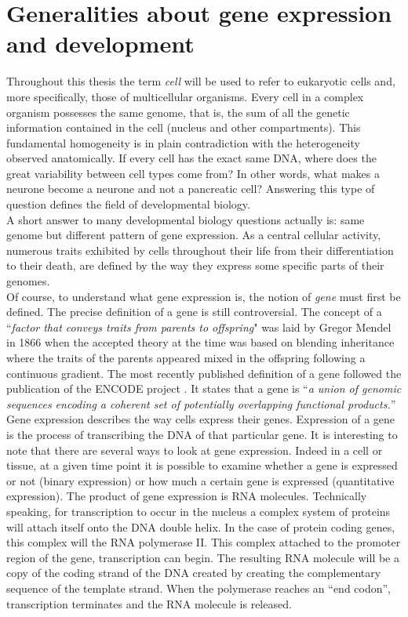 \section{Generalities about gene expression and development}\label{sec:gene_expression_background}     
       
     Throughout this thesis the term \emph{cell} will be used to refer to eukaryotic cells and, more specifically, those of multicellular organisms. Every cell in a complex organism possesses the same genome, that is, the sum of all the genetic information contained in the cell (nucleus and other compartments). This fundamental homogeneity is in plain contradiction with the heterogeneity observed anatomically. If every cell has the exact same DNA, where does the great variability between cell types come from? In other words, what makes a neurone become a neurone and not a pancreatic cell? Answering this type of question defines the field of developmental biology.\\
     
     A short answer to many developmental biology questions actually is: same genome but different pattern of gene expression. As a central cellular activity, numerous traits exhibited by cells throughout their life from their differentiation to their death, are defined by the way they express some specific parts of their genomes.\\

     Of course, to understand what gene expression is, the notion of \emph{gene} must first be defined. The precise definition of a gene is still controversial. The concept of a ``\emph{factor that conveys traits from parents to offspring}" was laid by Gregor Mendel in 1866 \cite{mendel66} when the accepted theory at the time was based on blending inheritance where the traits of the parents appeared mixed in the offspring following a continuous gradient. The most recently published definition of a gene followed the publication of the ENCODE project \cite{feingold04}. It states that a gene is ``\emph{a union of genomic sequences encoding a coherent set of potentially overlapping functional products.}''\\

	Gene expression describes the way cells express their genes. Expression of a gene is the process of transcribing the DNA of that particular gene. It is interesting to note that there are several ways to look at gene expression. Indeed in a cell or tissue, at a given time point it is possible to examine whether a gene is expressed or not (binary expression) or how much a certain gene is expressed (quantitative expression). The product of gene expression is RNA molecules. Technically speaking, for transcription to occur in the nucleus a complex system of proteins will attach itself onto the DNA double helix. In the case of protein coding genes, this complex will the RNA polymerase II. This complex attached to the promoter region of the gene, transcription can begin. The resulting RNA molecule will be a copy of the coding strand of the DNA created by creating the complementary sequence of the template strand. When the polymerase reaches an ``end codon'', transcription terminates and the RNA molecule is released.\\
	
